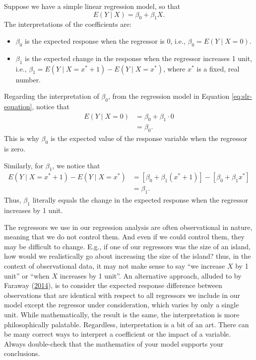 \documentclass[
]{book}
\providecommand{\tightlist}{%
  \setlength{\itemsep}{0pt}\setlength{\parskip}{0pt}}
\theoremstyle{definition}
\theoremstyle{definition}
\theoremstyle{definition}
\theoremstyle{definition}
\theoremstyle{remark}
\begin{document}
Suppose we have a simple linear regression model, so that \[
E(Y\mid X)=\beta_0 + \beta_1 X. \label{eq:slr-equation}
\] The interpretations of the coefficients are:

\begin{itemize}
\tightlist
\item
  \(\beta_0\) is the expected response when the regressor is 0, i.e.,
  \(\beta_0=E(Y\mid X=0)\).
\item
  \(\beta_1\) is the expected change in the response when the regressor
  increases 1 unit, i.e., \(\beta_1=E(Y\mid X=x^*+1)-E(Y\mid X=x^*)\),
  where \(x^*\) is a fixed, real number.
\end{itemize}

Regarding the interpretation of \(\beta_0\), from the regression model in
Equation \eqref{eq:slr-equation}, notice that \[
\begin{aligned}
E(Y\mid X = 0) &= \beta_0 + \beta_1 \cdot 0 \\
&= \beta_0.
\end{aligned}
\] This is why \(\beta_0\) is the expected value of the response variable
when the regressor is zero.

Similarly, for \(\beta_1\), we notice that \[
\begin{aligned}
E(Y\mid X=x^*+1)-E(Y\mid X=x^*) &= [\beta_0 + \beta_1 (x^* + 1)] - [\beta_0 + \beta_1 x^*] \\
&= \beta_1.
\end{aligned}
\] Thus, \(\beta_1\) literally equals the change in the expected response
when the regressor increases by 1 unit.

The regressors we use in our regression analysis are often observational
in nature, meaning that we do not control them. And even if we could
control them, they may be difficult to change. E.g., if one of our
regressors was the size of an island, how would we realistically go
about increasing the size of the island? thus, in the context of
observational data, it may not make sense to say ``we increase \(X\) by 1
unit'' or ``when \(X\) increases by 1 unit''. An alternative approach,
alluded to by Faraway (\protect\hyperlink{ref-lmwr2}{2014}), is to consider the expected response difference
between observations that are identical with respect to all regressors
we include in our model except the regressor under consideration, which
varies by only a single unit. While mathematically, the result is the
same, the interpretation is more philosophically palatable. Regardless,
interpretation is a bit of an art. There can be many correct ways to
interpret a coefficient or the impact of a variable. Always double-check
that the mathematics of your model supports your conclusions.
\end{document}
